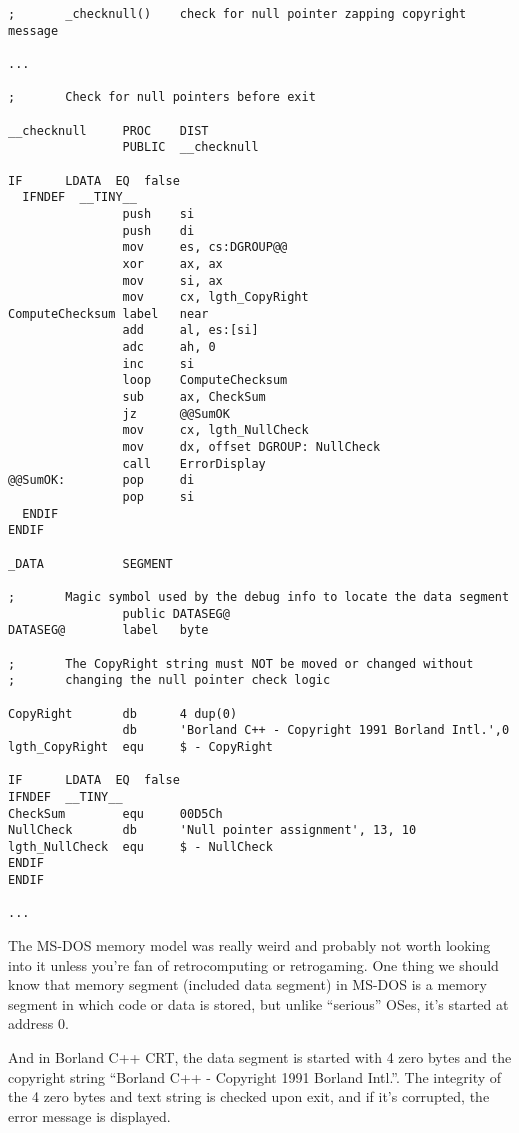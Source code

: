 \begin{lstlisting}
;       _checknull()    check for null pointer zapping copyright message

...

;       Check for null pointers before exit

__checknull     PROC    DIST
                PUBLIC  __checknull

IF      LDATA  EQ  false
  IFNDEF  __TINY__
                push    si
                push    di
                mov     es, cs:DGROUP@@
                xor     ax, ax
                mov     si, ax
                mov     cx, lgth_CopyRight
ComputeChecksum label   near
                add     al, es:[si]
                adc     ah, 0
                inc     si
                loop    ComputeChecksum
                sub     ax, CheckSum
                jz      @@SumOK
                mov     cx, lgth_NullCheck
                mov     dx, offset DGROUP: NullCheck
                call    ErrorDisplay
@@SumOK:        pop     di
                pop     si
  ENDIF
ENDIF

_DATA           SEGMENT

;       Magic symbol used by the debug info to locate the data segment
                public DATASEG@
DATASEG@        label   byte

;       The CopyRight string must NOT be moved or changed without
;       changing the null pointer check logic

CopyRight       db      4 dup(0)
                db      'Borland C++ - Copyright 1991 Borland Intl.',0
lgth_CopyRight  equ     $ - CopyRight

IF      LDATA  EQ  false
IFNDEF  __TINY__
CheckSum        equ     00D5Ch
NullCheck       db      'Null pointer assignment', 13, 10
lgth_NullCheck  equ     $ - NullCheck
ENDIF
ENDIF

...

\end{lstlisting}

The MS-DOS memory model was really weird and probably not worth looking into it unless you're fan of retrocomputing or retrogaming.
One thing we should know that memory segment (included data segment) in MS-DOS is a memory segment in which code or data is stored,
but unlike ``serious'' OSes, it's started at address 0.

And in Borland C++ \ac{CRT}, the data segment is started with 4 zero bytes and the copyright string ``Borland C++ - Copyright 1991 Borland Intl.''.
The integrity of the 4 zero bytes and text string is checked upon exit, and if it's corrupted, the error message is displayed.

